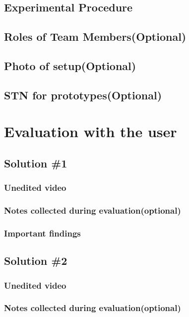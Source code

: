 \documentclass[a4paper,10pt,oneside]{scrreprt}
\begin{document}
\section{Experimental Procedure}
				
\section{Roles of Team Members(Optional)}

\section{Photo of setup(Optional)}

\section{STN for prototypes(Optional)}

\begingroup
\let\clearpage\relax
	\chapter{Evaluation with the user}
\endgroup

\section{Solution \#1}
\subsection{Unedited video}

\subsection{Notes collected during evaluation(optional)}

\subsection{Important findings}

\section{Solution \#2}
\subsection{Unedited video}

\subsection{Notes collected during evaluation(optional)}
\end{document}
